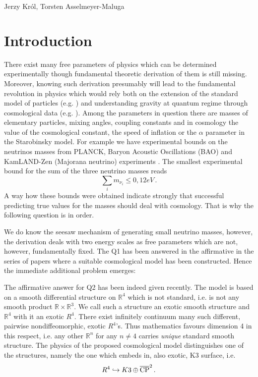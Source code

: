 \begin{artengenv2auth}{Jerzy Kr\'ol, Torsten Asselmeyer-Maluga}
\section{Introduction}
\lettrine[loversize=0.13,lines=2,lraise=-0.05,nindent=0em,findent=0.2pt]%
{T}{}here exist many free parameters of physics which can be determined experimentally though fundamental theoretic derivation of them is still missing. Moreover, knowing such derivation presumably will lead to the fundamental revolution in physics which would rely both on the extension of the standard model of particles (e.g. \cite{Weinberg2018}) and understanding gravity at quantum regime through cosmological data (e.g. \cite{Woodard2014}). Among the parameters in question there are masses of elementary particles, mixing angles, coupling constants and in cosmology the value of the cosmological constant, the speed of inflation or the $\alpha$ parameter in the Starobinsky model. For example we have experimental bounds on the neutrinos masses from PLANCK, Baryon Acoustic Oscillations (BAO) and KamLAND-Zen (Majorana neutrino) experiments \parencite{Neutrino-mass-KmLAND-Zen2016,PlanckCosmoParam2015,Neutrino2015}. The smallest experimental bound for the sum of the three neutrino masses reads
\[ \sum_i m_{\nu_i}\leq 0,12eV\,.\]
A way how these bounds were obtained indicate strongly that successful predicting true values for the masses should deal with cosmology. That is why the following question is in order.


We do know the seesaw mechanism of generating small neutrino masses, however, the derivation deals with two energy scales as free parameters which are not, however, fundamentally fixed. The Q1 has been answered in the affirmative in the series of papers \parencite{AK2018,AK2014,AK2019} where a suitable cosmological model has been constructed. Hence the immediate additional problem emerges:


The affirmative answer for Q2 has been indeed given recently. The model is based on a smooth differential structure on $\mathbb{R}^4$ which is not standard, i.e. is not any smooth product $\mathbb{R}\times\mathbb{R}^3$. We call such a structure an exotic smooth structure and $\mathbb{R}^4$ with it an exotic $R^4$. There exist infinitely continuum many such different, pairwise nondiffeomorphic, exotic $R^4$'s. Thus mathematics favours dimension 4 in this respect, i.e. any other $\mathbb{R}^n$ for any $n\neq 4$ carries {\em unique} standard smooth structure. The physics of the proposed cosmological model distinguishes one of the structures, namely the one which embeds in, also exotic, K3 surface, i.e.
\[R^4\hookrightarrow K3\oplus \overline{{\rm CP}}^2\,.  \]


\end{artengenv2auth}
